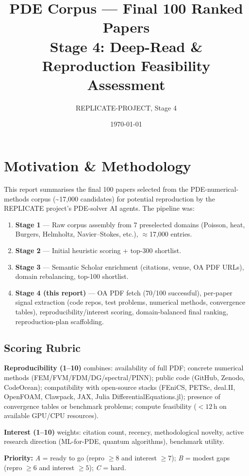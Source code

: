 \documentclass[10pt,letterpaper]{article}
\title{PDE Corpus — Final 100 Ranked Papers\\
\large Stage 4: Deep-Read \& Reproduction Feasibility Assessment}
\author{REPLICATE-PROJECT, Stage 4}
\date{\today}
\begin{document}
\maketitle

\section{Motivation \& Methodology}

This report summarises the final 100 papers selected from the PDE-numerical-methods corpus
(\textasciitilde17{,}000 candidates) for potential reproduction by the REPLICATE project's PDE-solver
AI agents. The pipeline was:

\begin{enumerate}[nosep]
  \item \textbf{Stage 1} — Raw corpus assembly from 7 preselected domains (Poisson,
        heat, Burgers, Helmholtz, Navier--Stokes, etc.), $\approx$17{,}000 entries.
  \item \textbf{Stage 2} — Initial heuristic scoring + top-300 shortlist.
  \item \textbf{Stage 3} — Semantic Scholar enrichment (citations, venue, OA PDF URLs),
        domain rebalancing, top-100 shortlist.
  \item \textbf{Stage 4 (this report)} — OA PDF fetch (70/100 successful),
        per-paper signal extraction (code repos, test problems, numerical methods,
        convergence tables), reproducibility/interest scoring, domain-balanced
        final ranking, reproduction-plan scaffolding.
\end{enumerate}

\subsection{Scoring Rubric}

\textbf{Reproducibility (1--10)} combines: availability of full PDF; concrete numerical
methods (FEM/FVM/FDM/DG/spectral/PINN); public code (GitHub, Zenodo, CodeOcean);
compatibility with open-source stacks (FEniCS, PETSc, deal.II, OpenFOAM, Clawpack,
JAX, Julia DifferentialEquations.jl); presence of convergence tables or benchmark
problems; compute feasibility ($< 12$\,h on available GPU/CPU resources).

\textbf{Interest (1--10)} weights: citation count, recency, methodological novelty,
active research direction (ML-for-PDE, quantum algorithms), benchmark utility.

\textbf{Priority:} \emph{A} = ready to go (repro $\ge 8$ and interest $\ge 7$);
\emph{B} = modest gaps (repro $\ge 6$ and interest $\ge 5$); \emph{C} = hard.
\end{document}
